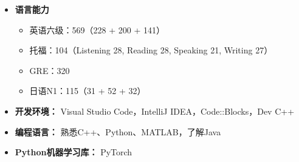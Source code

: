 \documentclass{resume}
\begin{document}
\begin{itemize}[parsep=0.5ex]
  \item \textbf{语言能力}
  \begin{itemize}
    \item 英语六级：569（228 + 200 + 141）
    \item 托福：104（Listening 28, Reading 28, Speaking 21, Writing 27）
    \item GRE：320
    \item 日语N1：115（31 + 52 + 32）
  \end{itemize}
  
  \item \textbf{开发环境：} Visual Studio Code，IntelliJ IDEA，Code::Blocks，Dev C++
  \item \textbf{编程语言：} 熟悉C++、Python、MATLAB，了解Java
  \item \textbf{Python机器学习库：} PyTorch
\end{itemize}
\end{document}
